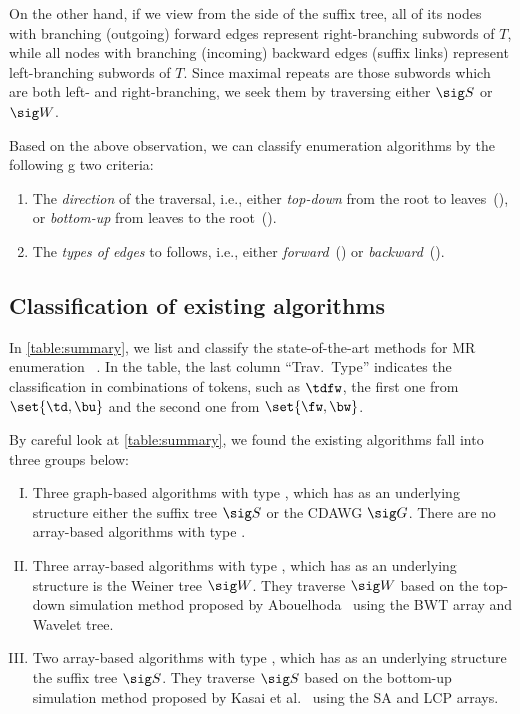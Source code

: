 On the other hand, if we view from the side of the suffix tree, all of its nodes with branching (outgoing) forward edges represent right-branching subwords of $T$, while all nodes with branching (incoming) backward edges (suffix links) represent left-branching subwords of $T$. Since maximal repeats are those subwords which are both left- and right-branching, we seek them by traversing either $\sig S$ or $\sig W$. 

Based on the above observation, we can classify enumeration algorithms by the following g two criteria: 
\begin{enumerate}[(1)]
\item The \textit{direction} of the traversal, i.e., either \textit{top-down} from the root to leaves~(\td), or \textit{bottom-up} from leaves to the root~(\bu). 
\item The \textit{types of edges} to follows, i.e., either \textit{forward}~(\fw) or \textit{backward}~(\bw). 
\end{enumerate}

\subsection{Classification of existing algorithms}

In \cref{table:summary}, we list and classify the state-of-the-art methods for MR enumeration ~\cite{narisawa2007efficient,okanohara2009linear,beller:berger2012space:efficient:bbo,belazzougui2020linear,nishimoto:cpm2021enum}. In the table, the last column ``Trav.~Type'' indicates the classification in combinations of tokens, such as $\tdfw$, the first one from $\set{\td, \bu}$ and the second one from $\set{\fw, \bw}$. 

By careful look at \cref{table:summary}, we found the existing algorithms fall into three groups below: 
\begin{enumerate}[(I)]
\item Three graph-based algorithms with type \tdfw, which has as an underlying structure either the suffix tree $\sig S$ or the CDAWG $\sig G$. 
There are no array-based algorithms with type \tdfw. 

\item Three array-based algorithms with type \tdbw, which has as an underlying structure is the Weiner tree $\sig W$. They traverse $\sig W$ based on the top-down simulation method proposed by Abouelhoda~\cite{abouelhoda2004replacing} using the BWT array and Wavelet tree. 


\item Two array-based algorithms with type \bufw, which has as an  underlying structure the suffix tree $\sig S$. They traverse $\sig S$ based on the bottom-up simulation method proposed by Kasai et al.~\cite{kasai:lee2001lcp:linear} 
using the SA and LCP arrays. 
\end{enumerate}

